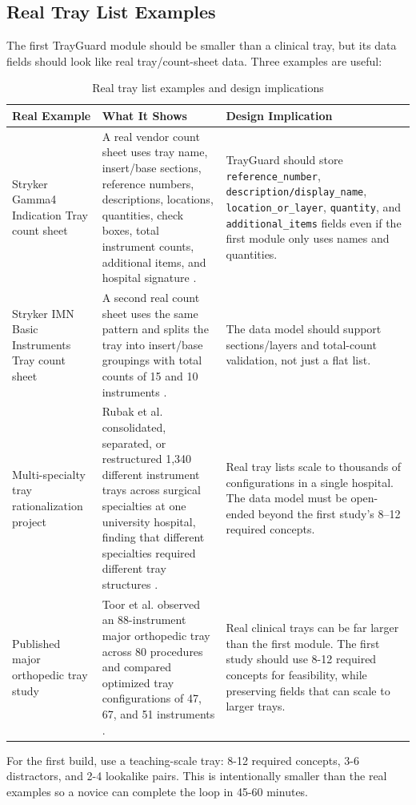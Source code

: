 \documentclass[10pt,a4paper]{article}
\begin{document}
\subsection{Real Tray List Examples}
\label{sec:real-tray-list-examples}

The first TrayGuard module should be smaller than a clinical tray, but its data
fields should look like real tray/count-sheet data. Three examples are useful:
\begin{table}[H]
\centering
\caption{Real tray list examples and design implications}
\label{tab:real-tray-list-examples-and-design-implications}
\small\renewcommand{\arraystretch}{1.2}\setlength{\tabcolsep}{4pt}
\begin{tabularx}{\textwidth}{|>{\raggedright\arraybackslash}X|>{\raggedright\arraybackslash}X|>{\raggedright\arraybackslash}X|}
\hline
Real Example & What It Shows & Design Implication \\
\hline
Stryker Gamma4 Indication Tray count sheet & A real vendor count sheet uses tray name, insert/base sections, reference numbers, descriptions, locations, quantities, check boxes, total instrument counts, additional items, and hospital signature \cite{stryker-gamma4-count-sheet-2023}. & TrayGuard should store \texttt{reference\_number}, \texttt{description/display\_name}, \texttt{location\_or\_layer}, \texttt{quantity}, and \texttt{additional\_items} fields even if the first module only uses names and quantities. \\
\hline
Stryker IMN Basic Instruments Tray count sheet & A second real count sheet uses the same pattern and splits the tray into insert/base groupings with total counts of 15 and 10 instruments \cite{stryker-imn-count-sheet-2023}. & The data model should support sections/layers and total-count validation, not just a flat list. \\
\hline
Multi-specialty tray rationalization project & Rubak et al. consolidated, separated, or restructured 1{,}340 different instrument trays across surgical specialties at one university hospital, finding that different specialties required different tray structures \cite{rubak-et-al-2024}. & Real tray lists scale to thousands of configurations in a single hospital. The data model must be open-ended beyond the first study's 8--12 required concepts. \\
\hline
Published major orthopedic tray study & Toor et al. observed an 88-instrument major orthopedic tray across 80 procedures and compared optimized tray configurations of 47, 67, and 51 instruments \cite{toor-et-al-2022}. & Real clinical trays can be far larger than the first module. The first study should use 8-12 required concepts for feasibility, while preserving fields that can scale to larger trays. \\
\hline
\end{tabularx}
\end{table}
For the first build, use a teaching-scale tray: 8-12 required concepts, 3-6
distractors, and 2-4 lookalike pairs. This is intentionally smaller than the
real examples so a novice can complete the loop in 45-60 minutes.
\end{document}
